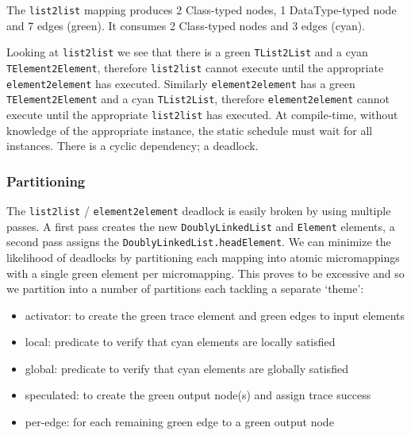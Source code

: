 \documentclass{llncs}
\begin{document}
The \verb$list2list$ mapping produces 2 Class-typed nodes, 1 DataType-typed node and 7 edges (green). It consumes 2 Class-typed nodes and 3 edges (cyan).

Looking at \verb$list2list$ we see that there is a green \verb$TList2List$ and a cyan \verb$TElement2Element$, therefore \verb$list2list$ cannot execute until the appropriate \verb$element2element$ has executed. Similarly \verb$element2element$ has a green \verb$TElement2Element$ and a cyan \verb$TList2List$, therefore \verb$element2element$ cannot execute until the appropriate \verb$list2list$ has executed. At compile-time, without knowledge of the appropriate instance, the static schedule must wait for all instances. There is a cyclic dependency; a deadlock.

\subsubsection{Partitioning}The \verb$list2list$ / \verb$element2element$ deadlock is easily broken by using multiple passes. A first pass creates the new \verb$DoublyLinkedList$ and \verb$Element$ elements, a second pass assigns the \verb$DoublyLinkedList.headElement$. We can minimize the likelihood of deadlocks by partitioning each mapping into atomic micromappings with a single green element per micromapping. This proves to be excessive and so we partition into a number of partitions each tackling a separate `theme':

\begin{itemize}
	\item activator: to create the green trace element and green edges to input elements
	\item local: predicate to verify that cyan elements are locally satisfied
	\item global: predicate to verify that cyan elements are globally satisfied
	\item speculated: to create the green output node(s) and assign trace success
	\item per-edge: for each remaining green edge to a green output node 
\end{itemize}


\end{document}
